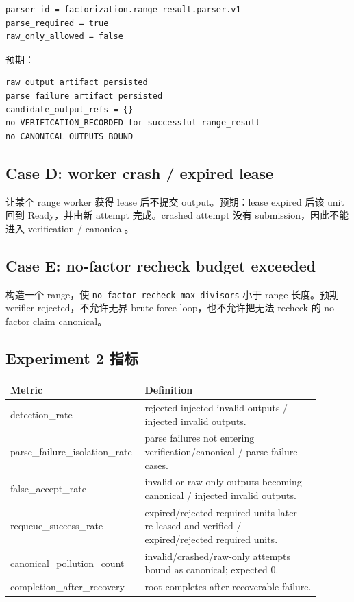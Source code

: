 \documentclass[11pt]{ctexart}
\begin{document}
\begin{lstlisting}
parser_id = factorization.range_result.parser.v1
parse_required = true
raw_only_allowed = false
\end{lstlisting}

预期：

\begin{lstlisting}
raw output artifact persisted
parse failure artifact persisted
candidate_output_refs = {}
no VERIFICATION_RECORDED for successful range_result
no CANONICAL_OUTPUTS_BOUND
\end{lstlisting}

\subsection{Case D: worker crash / expired lease}

让某个 range worker 获得 lease 后不提交 output。预期：lease expired 后该 unit 回到 Ready，并由新 attempt 完成。crashed attempt 没有 submission，因此不能进入 verification / canonical。

\subsection{Case E: no-factor recheck budget exceeded}

构造一个 range，使 \texttt{no\_factor\_recheck\_max\_divisors} 小于 range 长度。预期 verifier rejected，不允许无界 brute-force loop，也不允许把无法 recheck 的 no-factor claim canonical。

\subsection{Experiment 2 指标}

\begin{longtable}{p{0.35\linewidth}p{0.55\linewidth}}
\toprule
Metric & Definition \\
\midrule
detection\_rate & rejected injected invalid outputs / injected invalid outputs. \\
parse\_failure\_isolation\_rate & parse failures not entering verification/canonical / parse failure cases. \\
false\_accept\_rate & invalid or raw-only outputs becoming canonical / injected invalid outputs. \\
requeue\_success\_rate & expired/rejected required units later re-leased and verified / expired/rejected required units. \\
canonical\_pollution\_count & invalid/crashed/raw-only attempts bound as canonical; expected 0. \\
completion\_after\_recovery & root completes after recoverable failure. \\
\bottomrule
\end{longtable}
\end{document}

